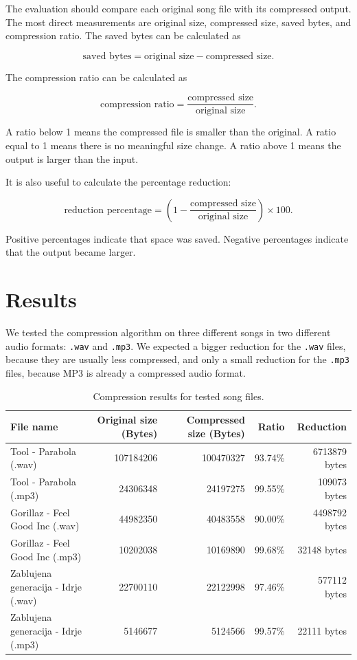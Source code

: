 \documentclass[11pt,a4paper]{article}
\begin{document}
The evaluation should compare each original song file with its compressed
output. The most direct measurements are original size, compressed size, saved
bytes, and compression ratio. The saved bytes can be calculated as

\[
\text{saved bytes} = \text{original size} - \text{compressed size}.
\]

The compression ratio can be calculated as

\[
\text{compression ratio} =
\frac{\text{compressed size}}{\text{original size}}.
\]

A ratio below 1 means the compressed file is smaller than the original. A ratio
equal to 1 means there is no meaningful size change. A ratio above 1 means the
output is larger than the input.

It is also useful to calculate the percentage reduction:

\[
\text{reduction percentage} =
\left(1 - \frac{\text{compressed size}}{\text{original size}}\right)
\times 100.
\]

Positive percentages indicate that space was saved. Negative percentages
indicate that the output became larger.

\section{Results}

We tested the compression algorithm on three different songs in two different
audio formats: \texttt{.wav} and \texttt{.mp3}. We expected a bigger reduction
for the \texttt{.wav} files, because they are usually less compressed, and only
a small reduction for the \texttt{.mp3} files, because MP3 is already a
compressed audio format.

\begin{table}[h]
\centering
\begin{tabular}{>{\raggedright\arraybackslash}p{4cm}rrrr}
\toprule
File name & Original size (Bytes) & Compressed size (Bytes) & Ratio & Reduction \\
\midrule
Tool - Parabola (.wav) & 107184206 & 100470327 & 93.74\% & 6713879 bytes \\
Tool - Parabola (.mp3) & 24306348 & 24197275 & 99.55\% & 109073 bytes \\
Gorillaz - Feel Good Inc (.wav) & 44982350 & 40483558 & 90.00\% & 4498792 bytes \\
Gorillaz - Feel Good Inc (.mp3) & 10202038 & 10169890 & 99.68\% & 32148 bytes \\
Zablujena generacija - Idrje (.wav) & 22700110 & 22122998 & 97.46\% & 577112 bytes \\
Zablujena generacija - Idrje (.mp3) & 5146677 & 5124566 & 99.57\% & 22111 bytes \\
\bottomrule
\end{tabular}
\caption{Compression results for tested song files.}
\end{table}
\end{document}
